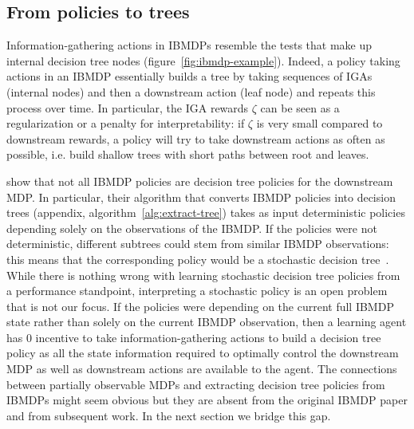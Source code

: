 \subsection{From policies to trees}\label{sec:extract-tree}

Information-gathering actions in IBMDPs resemble the tests that make up internal decision tree nodes (figure~\ref{fig:ibmdp-example}).
Indeed, a policy taking actions in an IBMDP essentially builds a tree by taking sequences of IGAs (internal nodes) and then a downstream action (leaf node) and repeats this process over time.
In particular, the IGA rewards $\zeta$ can be seen as a regularization or a penalty for interpretability: if $\zeta$ is very small compared to downstream rewards, a policy will try to take downstream actions as often as possible, i.e. build shallow trees with short paths between root and leaves.

\cite{topin2021iterative} show that not all IBMDP policies are decision tree policies for the downstream MDP.
In particular, their algorithm that converts IBMDP policies into decision trees (appendix, algorithm~\ref{alg:extract-tree}) takes as input deterministic policies depending solely on the observations of the IBMDP.
If the policies were not deterministic, different subtrees could stem from similar IBMDP observations: this means that the corresponding policy would be a stochastic decision tree~\citep{stoch-decision}.
While there is nothing wrong with learning stochastic decision tree policies from a performance standpoint, interpreting a stochastic policy is an open problem that is not our focus.
If the policies were depending on the current full IBMDP state rather than solely on the current IBMDP observation, then a learning agent has 0 incentive to take information-gathering actions to build a decision tree policy as all the state information required to optimally control the downstream MDP as well as downstream actions are available to the agent.
The connections between partially observable MDPs and extracting decision tree policies from IBMDPs might seem obvious but they are absent from the original IBMDP paper and from subsequent work.
In the next section we bridge this gap.
